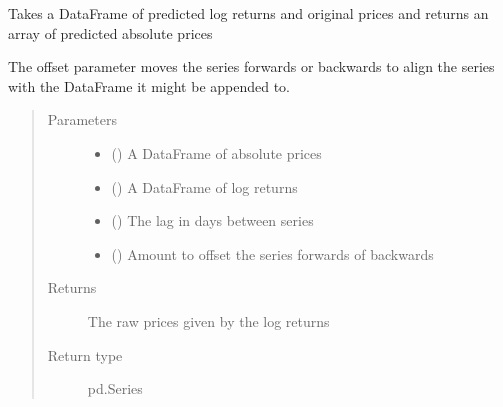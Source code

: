 \documentclass[letterpaper,10pt,english]{sphinxmanual}
\begin{document}

\begin{fulllineitems}
\label{\detokenize{eval_inspect:Foresight.eval_inspect.inverse_log_returns}}
Takes a DataFrame of predicted log returns and original
prices and returns an array of predicted absolute prices

The offset parameter moves the series forwards or backwards to
align the series with the DataFrame it might be appended to.
\begin{quote}\begin{description}
\item[{Parameters}] \leavevmode\begin{itemize}
\item {} 
 () \textendash{} A DataFrame of absolute prices

\item {} 
 () \textendash{} A DataFrame of log returns

\item {} 
 () \textendash{} The lag in days between series

\item {} 
 () \textendash{} Amount to offset the series forwards of backwards

\end{itemize}

\item[{Returns}] \leavevmode
The raw prices given by the log returns

\item[{Return type}] \leavevmode
pd.Series

\end{description}\end{quote}

\end{fulllineitems}
\end{document}
